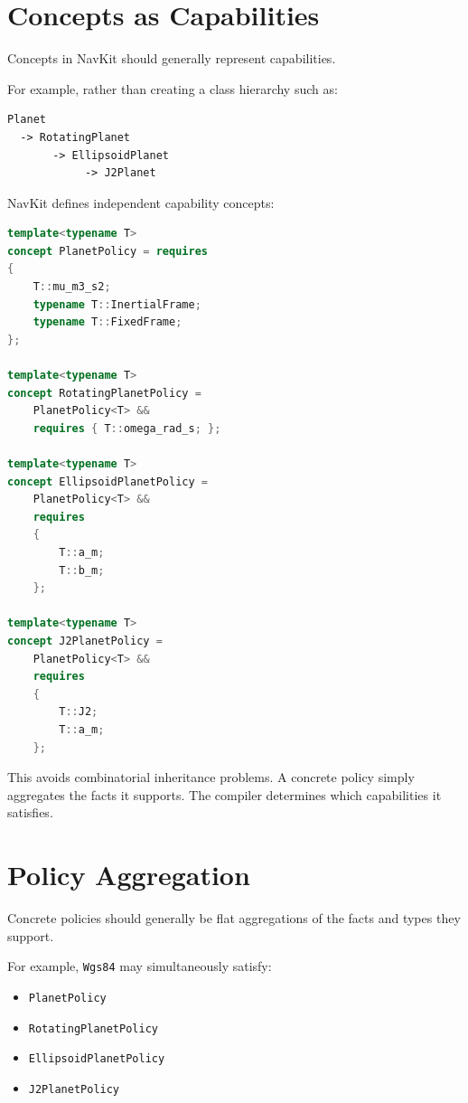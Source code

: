 \documentclass[11pt]{article}
\begin{document}
\section{Concepts as Capabilities}

Concepts in NavKit should generally represent capabilities.

For example, rather than creating a class hierarchy such as:

\begin{verbatim}
Planet
  -> RotatingPlanet
       -> EllipsoidPlanet
            -> J2Planet
\end{verbatim}

NavKit defines independent capability concepts:

\begin{lstlisting}[language=C++]
template<typename T>
concept PlanetPolicy = requires
{
    T::mu_m3_s2;
    typename T::InertialFrame;
    typename T::FixedFrame;
};

template<typename T>
concept RotatingPlanetPolicy =
    PlanetPolicy<T> &&
    requires { T::omega_rad_s; };

template<typename T>
concept EllipsoidPlanetPolicy =
    PlanetPolicy<T> &&
    requires
    {
        T::a_m;
        T::b_m;
    };

template<typename T>
concept J2PlanetPolicy =
    PlanetPolicy<T> &&
    requires
    {
        T::J2;
        T::a_m;
    };
\end{lstlisting}

This avoids combinatorial inheritance problems. A concrete policy simply
aggregates the facts it supports. The compiler determines which capabilities it
satisfies.

\section{Policy Aggregation}

Concrete policies should generally be flat aggregations of the facts and types
they support.

For example, \texttt{Wgs84} may simultaneously satisfy:

\begin{itemize}
    \item \texttt{PlanetPolicy}
    \item \texttt{RotatingPlanetPolicy}
    \item \texttt{EllipsoidPlanetPolicy}
    \item \texttt{J2PlanetPolicy}
\end{itemize}
\end{document}
